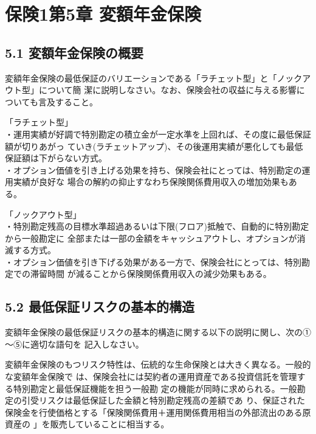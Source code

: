 \documentclass[report,gutter=10mm,fore-edge=10mm,uplatex,dvipdfmx]{jlreq}
\begin{document}
\chapter{保険1第5章 変額年金保険}
\section{5.1 変額年金保険の概要}
変額年金保険の最低保証のバリエーションである「ラチェット型」と「ノックアウト型」について簡
潔に説明しなさい。なお、保険会社の収益に与える影響についても言及すること。
\answer{}

「ラチェット型」\\
・運用実績が好調で特別勘定の積立金が一定水準を上回れば、その度に最低保証額が切りあがっ
ていき(ラチェットアップ)、その後運用実績が悪化しても最低保証額は下がらない方式。\\
・オプション価値を引き上げる効果を持ち、保険会社にとっては、特別勘定の運用実績が良好な
場合の解約の抑止すなわち保険関係費用収入の増加効果もある。

「ノックアウト型」\\
・特別勘定残高の目標水準超過あるいは下限(フロア)抵触で、自動的に特別勘定から一般勘定に
全部または一部の金額をキャッシュアウトし、オプションが消滅する方式。\\
・オプション価値を引き下げる効果がある一方で、保険会社にとっては、特別勘定での滞留時間
が減ることから保険関係費用収入の減少効果もある。

\section{5.2 最低保証リスクの基本的構造}
変額年金保険の最低保証リスクの基本的構造に関する以下の説明に関し、次の①～⑤に適切な語句を
記入しなさい。\vspace{1zh}

変額年金保険のもつリスク特性は、伝統的な生命保険とは大きく異なる。一般的な変額年金保険で
は、保険会社には契約者の運用資産である投資信託を管理する特別勘定と最低保証機能を担う一般勘
定の機能が同時に求められる。一般勘定の引受リスクは最低保証した金額と特別勘定残高の差額であ
り、保証された保険金を行使価格とする「保険関係費用＋運用関係費用相当の外部流出のある原資産の
」を販売していることに相当する。
\end{document}
